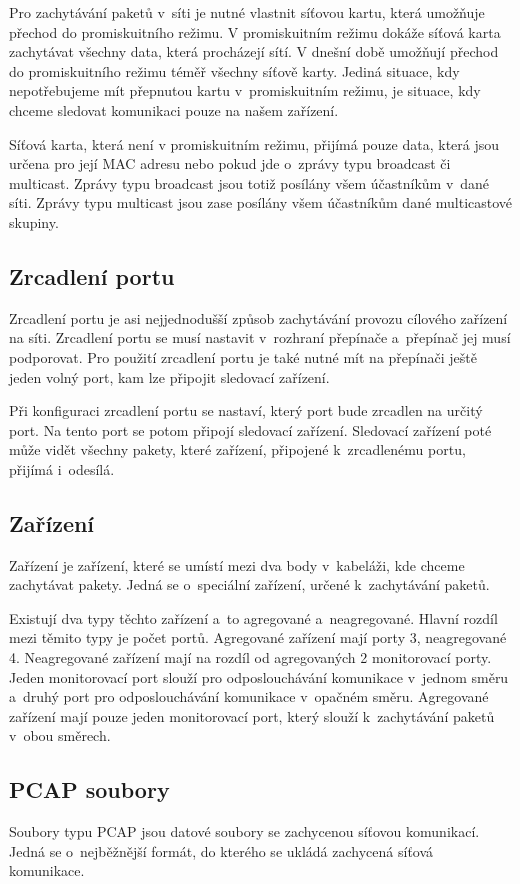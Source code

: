 Pro zachytávání paketů v~síti je nutné vlastnit síťovou kartu, která umožňuje přechod do promiskuitního režimu. V promiskuitním režimu dokáže síťová karta zachytávat všechny data, která procházejí sítí. V dnešní době umožňují přechod do promiskuitního režimu téměř všechny síťově karty. Jediná situace, kdy nepotřebujeme mít přepnutou kartu v~promiskuitním režimu, je situace, kdy chceme sledovat komunikaci pouze na našem zařízení.

Síťová karta, která není v promiskuitním režimu, přijímá pouze data, která jsou určena pro její MAC adresu nebo pokud jde o~zprávy typu broadcast či multicast. Zprávy typu broadcast jsou totiž posílány všem účastníkům v~dané síti. Zprávy typu multicast jsou zase posílány všem účastníkům dané multicastové skupiny.

\subsection{Zrcadlení portu}
Zrcadlení portu je asi nejjednodušší způsob zachytávání provozu cílového zařízení na síti. Zrcadlení portu se musí nastavit v~rozhraní přepínače a~přepínač jej musí podporovat. Pro použití zrcadlení portu je také nutné mít na přepínači ještě jeden volný port, kam lze připojit sledovací zařízení.

Při konfiguraci zrcadlení portu se nastaví, který port bude zrcadlen na určitý port. Na tento port se potom připojí sledovací zařízení. Sledovací zařízení poté může vidět všechny pakety, které zařízení, připojené k~zrcadlenému portu, přijímá i~odesílá. 

\subsection{Zařízení }
Zařízení  je zařízení, které se umístí mezi dva body v~kabeláži, kde chceme zachytávat pakety. Jedná se o~speciální zařízení, určené k~zachytávání paketů.

Existují dva typy těchto zařízení a~to agregované a~neagregované. Hlavní rozdíl mezi těmito typy je počet portů. Agregované zařízení mají porty 3, neagregované 4. Neagregované zařízení mají na rozdíl od agregovaných 2 monitorovací porty. Jeden monitorovací port slouží pro odposlouchávání komunikace v~jednom směru a~druhý port pro odposlouchávání komunikace v~opačném směru. Agregované zařízení mají pouze jeden monitorovací port, který slouží k~zachytávání paketů v~obou směrech. 

\subsection{PCAP soubory}
Soubory typu PCAP jsou datové soubory se zachycenou síťovou komunikací. Jedná se o~nejběžnější formát, do kterého se ukládá zachycená síťová komunikace.

